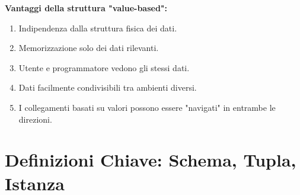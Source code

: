 \textbf{Vantaggi della struttura "value-based":}
\begin{enumerate}
	\item Indipendenza dalla struttura fisica dei dati.
	\item Memorizzazione solo dei dati rilevanti.
	\item Utente e programmatore vedono gli stessi dati.
	\item Dati facilmente condivisibili tra ambienti diversi.
	\item I collegamenti basati su valori possono essere "navigati" in entrambe le direzioni.
\end{enumerate}

\section{Definizioni Chiave: Schema, Tupla, Istanza}
